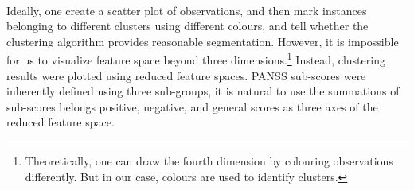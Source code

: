 \documentclass[11pt]{article}
\begin{document}
	\paragraph{} Ideally, one create a scatter plot of observations, and then mark instances belonging to different clusters using different colours, and tell whether the clustering algorithm provides reasonable segmentation. However, it is impossible for us to visualize feature space beyond three dimensions.\footnote{Theoretically, one can draw the fourth dimension by colouring observations differently. But in our case, colours are used to identify clusters.} Instead, clustering results were plotted using reduced feature spaces. PANSS sub-scores were inherently defined using three sub-groups, it is natural to use the summations of sub-scores belongs positive, negative, and general scores as three axes of the reduced feature space.
\end{document}
